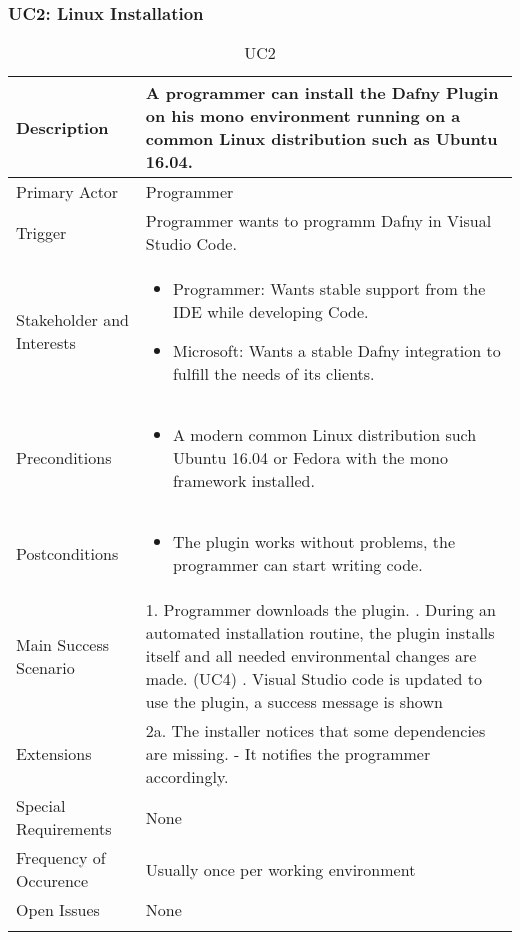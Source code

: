 \subsubsection{UC2: Linux Installation}
\begin{longtable}{l | p{} }
	Description & A programmer can install the Dafny Plugin on his mono environment running on a common Linux distribution such as Ubuntu 16.04.\\ \hline
	Primary Actor & Programmer\\ \hline
	Trigger & Programmer wants to programm Dafny in Visual Studio Code.\\ \hline
	Stakeholder and Interests & 
	\begin{itemize}
		\item Programmer: Wants stable support from the IDE while developing Code.
		\item Microsoft: Wants a stable Dafny integration to fulfill the needs of its clients.
	\end{itemize} \\ \hline
	Preconditions & 
	\begin{itemize}
		\item A modern common Linux distribution such Ubuntu 16.04 or Fedora with the mono framework installed.
	\end{itemize} \\ \hline
	Postconditions &
	\begin{itemize}
		\item The plugin works without problems, the programmer can start writing code.
	\end{itemize} \\ \hline
	Main Success Scenario &
	1. Programmer downloads the plugin. \newline
	2. During an automated installation routine, the plugin installs itself and all needed environmental changes are made. (UC4) \newline
	3. Visual Studio code is updated to use the plugin, a success message is shown\\ \hline
	Extensions &
	2a. The installer notices that some dependencies are missing. \newline
	- It notifies the programmer accordingly.\\ \hline
	Special Requirements & None\\ \hline
	Frequency of Occurence & Usually once per working environment\\ \hline
	Open Issues & None \\ \hline
	\caption{UC2}
\end{longtable}

